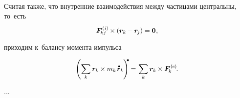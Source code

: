 \foreignlanguage{russian}{Считая также, что внутренние взаимодействия между частицами центральны, то~есть}

\nopagebreak\vspace{-0.1em}\begin{equation*}
\bm{F}^{\expinternal}_{\hspace{-0.16ex}kj} \times \left( \bm{r}_k \hspace{-0.12ex} - \bm{r}_{\hspace{-0.16ex}j} \right) = \bm{0} \hspace{.1ex},
\end{equation*}

\vspace{-0.2em} \noindent \foreignlanguage{russian}{приходим к~балансу момента импульса}

\nopagebreak\vspace{-0.2em}\begin{equation}\label{balanceofrotationalmomentum.discrete}
\left( \displaystyle \sum_{\smash{k}} \bm{r}_k \hspace{-0.12ex} \times m_k \hspace{.2ex} \mathdotabove{\bm{r}}_k \hspace{-0.16ex} \right)^{\hspace{-0.25em}\tikz[baseline=-0.2ex]\draw[black, fill=black] (0,0) circle (.28ex);} \hspace{-0.12ex}
= \hspace{.16ex}
\displaystyle \sum_{\smash{k}} \bm{r}_k \hspace{-0.12ex} \times \bm{F}^{\expexternal}_{\hspace{-0.16ex}k} \hspace{-0.12ex}.
\end{equation}

...


\newpage




